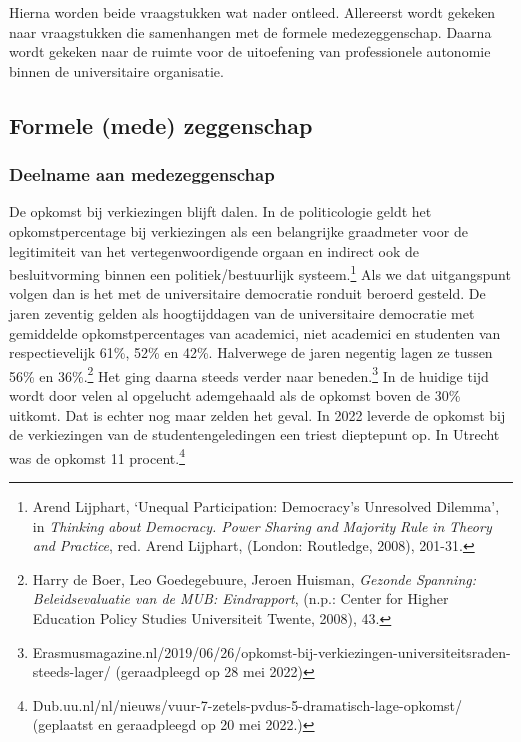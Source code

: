 \documentclass[smallauthor, chapterhaspagenum, nochapterinheader, pagenuminheader,  bigchapnum,medium2, tocpages,  garamond, titleinheader]{jote-book}
\begin{document}
	Hierna worden beide vraagstukken wat nader ontleed. Allereerst wordt gekeken naar vraagstukken die samenhangen met de formele medezeggenschap. Daarna wordt gekeken naar de ruimte voor de uitoefening van professionele autonomie binnen de universitaire organisatie.



	\subsection{Formele (mede) zeggenschap}



	\subsubsection{Deelname aan medezeggenschap }



	De opkomst bij verkiezingen blijft dalen. In de politicologie geldt het opkomstpercentage bij verkiezingen als een belangrijke graadmeter voor de legitimiteit van het vertegenwoordigende orgaan en indirect ook de besluitvorming binnen een politiek/bestuurlijk systeem.\footnote{Arend Lijphart, ‘Unequal Participation: Democracy's Unresolved Dilemma', in \emph{Thinking }\emph{about}\emph{ }\emph{Democracy}\emph{. Power }\emph{Sharing}\emph{ }\emph{and}\emph{ }\emph{Majority}\emph{ }\emph{Rule}\emph{ in }\emph{Theory}\emph{ }\emph{and}\emph{ }\emph{Practice}, red. Arend Lijphart, (London: Routledge, 2008), 201-31.} Als we dat uitgangspunt volgen dan is het met de universitaire democratie ronduit beroerd gesteld. De jaren zeventig gelden als hoogtijddagen van de universitaire democratie met gemiddelde opkomstpercentages van academici, niet academici en studenten van respectievelijk 61\%, 52\% en 42\%. Halverwege de jaren negentig lagen ze tussen 56\% en 36\%.\footnote{Harry de Boer, Leo Goedegebuure, Jeroen Huisman, \emph{Gezonde Spanning: Beleidsevaluatie van de MUB: Eindrapport}, (n.p.: Center for Higher Education Policy Studies Universiteit Twente, 2008), 43.} Het ging daarna steeds verder naar beneden.\footnote{Erasmusmagazine.nl/2019/06/26/opkomst-bij-verkiezingen-universiteitsraden-steeds-lager/ (geraadpleegd op 28 mei 2022)} In de huidige tijd wordt door velen al opgelucht ademgehaald als de opkomst boven de 30\% uitkomt. Dat is echter nog maar zelden het geval. In 2022 leverde de opkomst bij de verkiezingen van de studentengeledingen een triest dieptepunt op. In Utrecht was de opkomst 11 procent.\footnote{Dub.uu.nl/nl/nieuws/vuur-7-zetels-pvdus-5-dramatisch-lage-opkomst/ (geplaatst en geraadpleegd op 20 mei 2022.)}
\end{document}

